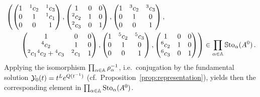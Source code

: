 \begin{align*}
  &\left(
    \begin{pmatrix} 1 & {}^1c_2 & {}^1c_3 \\0 & 1 & {}^1c_1 \\0 & 0 & 1 \end{pmatrix},
    \begin{pmatrix} 1 & 0 & 0 \\{}^2c_2 & 1 & 0 \\{}^2c_3 & 0 & 1 \end{pmatrix},
    \begin{pmatrix} 1 & {}^3c_2 & {}^3c_3 \\0 & 1 & 0 \\0 & 0 & 1 \end{pmatrix},
  \right.
\\&\qquad
  \left.
    \begin{pmatrix} 1 & 0 & 0 \\{}^4c_2 & 1 & 0 \\{}^2c_1{}^4c_2+{}^4c_3 & {}^2c_1 & 1 \end{pmatrix},
    \begin{pmatrix} 1 & {}^5c_2 & {}^5c_3 \\0 & 1 & 0 \\0 & 0 & 1 \end{pmatrix},
    \begin{pmatrix} 1 & 0 & 0 \\{}^{6}c_2 & 1 & 0 \\{}^{6}c_3 & 0 & 1 \end{pmatrix}
  \right)
  \in
  \prod_{\alpha\in\mathbb{A}}\operatorname{\mathbb{S}to}_{\alpha}(A^0) \,.
\end{align*}
Applying the isomorphism $\prod_{\alpha\in\mathbb{A}}\rho_\alpha^{-1}$, i.e.\
conjugation by the fundamental solution $\mathcal{Y}_0(t)=t^Le^{Q(t^{-1})}$ (cf.\
Proposition~\ref{prop:representation}), yields then the corresponding element in
$\prod_{\alpha\in\mathbb{A}}\operatorname{Sto}_{\alpha}(A^0)$.
